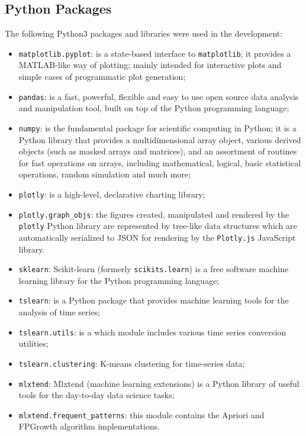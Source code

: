 \documentclass[11pt,a4paper]{article}
\begin{document}
\subsection{Python Packages}
The following Python3 packages and libraries were used in the development:
\begin{itemize}
    \item \texttt{matplotlib.pyplot}: is a state-based interface to
    \texttt{matplotlib}; it provides a MATLAB-like way of plotting; mainly
    intended for interactive plots and simple cases of programmatic plot
    generation;
    \item \texttt{pandas}: is a fast, powerful, flexible and easy to use open
    source data analysis and manipulation tool, built on top of the Python
    programming language;
    \item \texttt{numpy}: is the fundamental package for scientific computing in
    Python; it is a Python library that provides a multidimensional array
    object, various derived objects (such as masked arrays and matrices), and an
    assortment of routines for fast operations on arrays, including
    mathematical, logical, basic statistical operations, random simulation and
    much more;
    \item \texttt{plotly}: is a high-level, declarative charting library;
    \item \texttt{plotly.graph\_objs}: the figures created, manipulated and
    rendered by the \texttt{plotly} Python library are represented by tree-like
    data structures which are automatically serialized to JSON for rendering by
    the \texttt{Plotly.js} JavaScript library.
    \item \texttt{sklearn}: Scikit-learn (formerly \texttt{scikits.learn}) is a
    free software machine learning library for the Python programming language;
    \item \texttt{tslearn}: is a Python package that provides machine learning
    tools for the analysis of time series;
    \item \texttt{tslearn.utils}: is a which module includes various time
    series conversion utilities;
    \item \texttt{tslearn.clustering}: K-means clustering for time-series data;
    \item \texttt{mlxtend}: Mlxtend (machine learning extensions) is a Python
    library of useful tools for the day-to-day data science tasks;
    \item \texttt{mlxtend.frequent\_patterns}: this module contains the Apriori
    and FPGrowth algorithm implementations.
\end{itemize}
\end{document}
